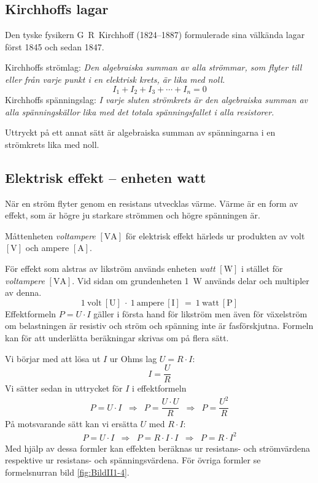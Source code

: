 \subsection{Kirchhoffs lagar}

Den tyske fysikern G~R~Kirchhoff (1824--1887) formulerade sina välkända lagar
först 1845 och sedan 1847.

Kirchhoffs strömlag: \emph{Den algebraiska summan av alla strömmar, som flyter till eller från varje punkt i en elektrisk krets, är lika med noll.}
\[I_1 + I_2 + I_3 + \cdots + I_n = 0\]
Kirchhoffs spänningslag: \emph{I varje sluten strömkrets är den algebraiska summan av alla spänningskällor lika med det totala spänningsfallet i alla resistorer.}

Uttryckt på ett annat sätt är algebraiska summan av spänningarna i en
strömkrets lika med noll.

\subsection{Elektrisk effekt -- enheten watt}
\label{elektrisk_effekt}

När en ström flyter genom en resistans utvecklas värme.
Värme är en form av effekt, som är högre ju starkare strömmen och högre
spänningen är.

Måttenheten \emph{voltampere} \(\mathrm{[VA]}\) för elektrisk effekt härleds ur
produkten av volt \(\mathrm{[V]}\) och ampere \(\mathrm{[A]}\).

För effekt som alstras av likström används enheten \emph{watt} \(\mathrm{[W]}\)
\cite{SIbrochure8} i stället för \emph{voltampere} \(\mathrm{[VA]}\).
Vid sidan om grundenheten \SI{1}{\watt} används delar och multipler av denna.
\[1\ \mathrm{volt\ [U]}\ \cdot\ 1\ \mathrm{ampere\ [I]}\ =\ 1\ \mathrm{watt\ [P]}\]
Effektformeln \(P = U \cdot I\) gäller i första hand för likström men även för
växelström om belastningen är resistiv och ström och spänning inte är
fasförskjutna.
Formeln kan för att underlätta beräkningar skrivas om på flera sätt.

Vi börjar med att lösa ut $I$ ur Ohms lag $U = R \cdot I$:
\[
I = \dfrac{U}{R}
\]
Vi sätter sedan in uttrycket för $I$ i effektformeln
\[
\begin{array}{lllll}
P=U \cdot I & \Rightarrow & P= \dfrac{U \cdot U}{R} & \Rightarrow & P= \dfrac{U^2}{R}
\end{array}
\]
På motsvarande sätt kan vi ersätta $U$ med $R \cdot I$:
\[
\begin{array}{lllll}
P=U \cdot I & \Rightarrow & P = R \cdot I \cdot I  & \Rightarrow & P = R \cdot I^2
\end{array}
\]
Med hjälp av dessa formler kan effekten beräknas ur resistans- och strömvärdena
respektive ur resistans- och spänningsvärdena.
För övriga formler se formelsnurran bild \ref{fig:BildII1-4}.

